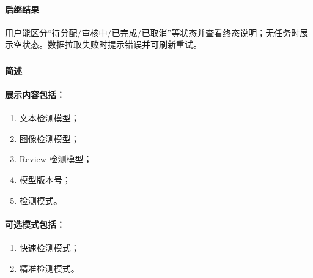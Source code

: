 \paragraph*{后继结果}

用户能区分“待分配/审核中/已完成/已取消”等状态并查看终态说明；无任务时展示空状态。数据拉取失败时提示错误并可刷新重试。

\subsubsection{}

\paragraph*{简述}


\paragraph*{展示内容包括：}

\begin{enumerate}
    \item 文本检测模型；
    \item 图像检测模型；
    \item Review 检测模型；
    \item 模型版本号；
    \item 检测模式。
\end{enumerate}

\paragraph*{可选模式包括：}

\begin{enumerate}
    \item 快速检测模式；
    \item 精准检测模式。
\end{enumerate}
